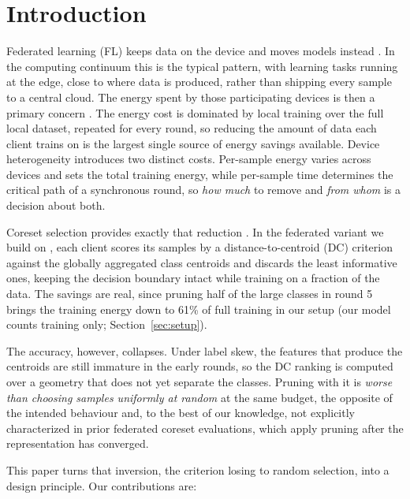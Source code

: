 \documentclass[conference]{IEEEtran}
\begin{document}
\section{Introduction}
Federated learning (FL) keeps data on the device and moves models instead
\cite{fedavg}. In the computing continuum this is the typical pattern, with learning
tasks running at the edge, close to where data is produced, rather than shipping
every sample to a central cloud. The energy spent by those participating devices
is then a primary concern \cite{greenfl}. The energy cost is dominated by local training over the
full local dataset, repeated for every round, so reducing the amount of data
each client trains on is the largest single source of energy savings available.
Device heterogeneity introduces two distinct costs. Per-sample energy varies across
devices and sets the total training energy, while per-sample time determines the
critical path of a synchronous round, so \emph{how much} to remove and
\emph{from whom} is a decision about both.

Coreset selection provides exactly that reduction \cite{coreset}. In the federated
variant we build on \cite{fedcs}, each client scores its samples by a
distance-to-centroid (DC) criterion against the globally aggregated class
centroids and discards the least informative ones, keeping the decision boundary intact
while training on a fraction of the data. The savings are real, since pruning half of
the large classes in round 5 brings the training energy down to 61\% of full training
in our setup (our model counts training only; Section~\ref{sec:setup}).

The accuracy, however, collapses. Under label skew, the features that produce the
centroids are still immature in the early rounds, so the DC ranking is computed over a
geometry that does not yet separate the classes. Pruning with it is \emph{worse than
choosing samples uniformly at random} at the same budget, the opposite of the intended
behaviour and, to the best of our knowledge, not explicitly characterized in prior
federated coreset evaluations, which apply pruning after the representation has
converged.

This paper turns that inversion, the criterion losing to random selection, into a design principle. Our contributions are:
\end{document}
